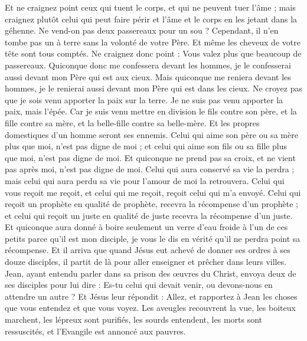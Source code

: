 \begin{multicols}{2}
Et ne craignez point ceux qui tuent le corps, et qui ne peuvent tuer l'âme ; mais craignez plutôt celui qui peut faire périr et l'âme et le corps en les jetant dans la géhenne.
Ne vend-on pas deux passereaux pour un sou ? Cependant, il n’en tombe pas un à terre sans la volonté de votre Père.
Et même les cheveux de votre tête sont tous comptés.
Ne craignez donc point : Vous valez plus que beaucoup de passereaux.
Quiconque donc me confessera devant les hommes, je le confesserai aussi devant mon Père qui est aux cieux.
Mais quiconque me reniera devant les hommes, je le renierai aussi devant mon Père qui est dans les cieux.
Ne croyez pas que je sois venu apporter la paix sur la terre. Je ne suis pas venu apporter la paix, mais l'épée.
Car je suis venu mettre en division le fils contre son père, et la fille contre sa mère, et la belle-fille contre sa belle-mère.
Et les propres domestiques d'un homme seront ses ennemis.
Celui qui aime son père ou sa mère plus que moi, n'est pas digne de moi ; et celui qui aime son fils ou sa fille plus que moi, n'est pas digne de moi.
Et quiconque ne prend pas sa croix, et ne vient pas après moi, n'est pas digne de moi.
Celui qui aura conservé sa vie la perdra ; mais celui qui aura perdu sa vie pour l'amour de moi la retrouvera.
Celui qui vous reçoit me reçoit, et celui qui me reçoit, reçoit celui qui m'a envoyé.
Celui qui reçoit un prophète en qualité de prophète, recevra la récompense d'un prophète ; et celui qui reçoit un juste en qualité de juste recevra la récompense d'un juste.
Et quiconque aura donné à boire seulement un verre d'eau froide à l’un de ces petits parce qu’il est mon disciple, je vous le dis en vérité qu'il ne perdra point sa récompense.
\VerseOne{}Et il arriva que quand Jésus eut achevé de donner ses ordres à ses douze disciples, il partit de là pour aller enseigner et prêcher dans leurs villes.
Jean, ayant entendu parler dans sa prison des œuvres du Christ, envoya deux de ses disciples pour lui dire :
Es-tu celui qui devait venir, ou devons-nous en attendre un autre ?
Et Jésus leur répondit : Allez, et rapportez à Jean les choses que vous entendez et que vous voyez.
Les aveugles recouvrent la vue, les boiteux marchent, les lépreux sont purifiés, les sourds entendent, les morts sont ressuscités, et l'Evangile est annoncé aux pauvres.

\end{multicols}
